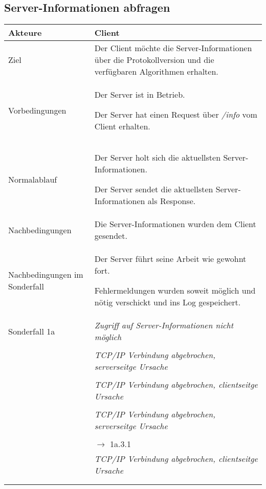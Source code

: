 \documentclass[a4paper,10pt,titlepage]{article}
\makeatletter
\newcommand\novspace{\@minipagetrue}
\newenvironment{owncompactitem}{%
\compactitem
}{%
\@finalstrut\@arstrutbox
\@nameuse{endcompactitem}%
\aftergroup\let\aftergroup\@finalstrut\aftergroup\@gobble
}
\newenvironment{owncompactenum}{%
\compactenum
}{%
\@finalstrut\@arstrutbox
\@nameuse{endcompactenum}%
\aftergroup\let\aftergroup\@finalstrut\aftergroup\@gobble
}
\newcommand{\usecase}[7]
{\subsection{#1}
\setlength{\extrarowheight}{2pt}
\begin{tabular}{|p{0.2\textwidth}|p{0.9\textwidth}|}
\hline
  Akteure & #2\\\hline
  Ziel & #3\\\hline
  Vorbedingungen & \novspace
  	\begin{owncompactitem}[-] #4 \end{owncompactitem} \\\hline
  Normalablauf & \vspace{-7pt}
  	\begin{owncompactenum}[1.] #6 \end{owncompactenum} \\\hline
  Nachbedingungen & \novspace
  	\begin{owncompactitem}[-] #5 \end{owncompactitem} \\\hline
  #7
\end{tabular}
}
\newcommand{\sonderfall}[4][\empty]
{
Sonderfall #2 & \vspace{-10pt}
	\textit{#3}
	\begin{owncompactenum}[{#2}.1] {#4} \end{owncompactenum}
  	\ifthenelse{\equal{#1}{\empty}}
    	{\\\hline} %
    	{\ensuremath{\rightarrow} #1 \\ [+1pt] \hline} %

}
\newcommand{\kurzersonderfall}[3][\empty]
{
Sonderfall #2 & \vspace{-10pt}
	\textit{#3}
  	\ifthenelse{\equal{#1}{\empty}}
    	{\\\hline} %
    	{\\&\ensuremath{\rightarrow} #1 \\ [+1pt] \hline} %

}
\newcommand{\sondernachbedingung}[1]
{
Nachbedingungen im Sonderfall& \novspace
	\begin{owncompactitem}[-]
		#1
	\end{owncompactitem} \\\hline
}
\makeatother
\begin{document}
\usecase{Server-Informationen abfragen}{Client}%
{%
Der Client möchte die Server-Informationen über die Protokollversion und die verfügbaren Algorithmen erhalten.
}{%
\item Der Server ist in Betrieb.
\item Der Server hat einen Request über \textit{/info} vom Client erhalten.
}{%
\item Die Server-Informationen wurden dem Client gesendet.
}{%
\item Der Server holt sich die aktuellsten Server-Informationen.
\item Der Server sendet die aktuellsten Server-Informationen als Response.
}{%
\sondernachbedingung{
	\item Der Server führt seine Arbeit wie gewohnt fort.
	\item Fehlermeldungen wurden soweit möglich und nötig verschickt und ins Log gespeichert.}

\sonderfall{1a}%
	{%
	Zugriff auf Server-Informationen nicht möglich
	}{%
	\item Fehlermeldung "`Zugriff auf Server-Informationen nicht möglich"' ins Log schreiben
  	\item Fehlermeldung "`Zugriff auf Server-Informationen nicht möglich"' an Admins verschicken
  	\item Fehlermeldung an Client schicken}

\sonderfall{1a.3a}%
	{%
	TCP/IP Verbindung abgebrochen, serverseitge Ursache
	}{%
	\item Fehlermeldung "`Serverseitiger Internetausfall"' ins Log schreiben
  	\item Fehlermeldung "`Serverseitiger Internetausfall"' an Admins verschicken}

\sonderfall{1a.3b}%
	{%
	TCP/IP Verbindung abgebrochen, clientseitge Ursache
	}{%
	\item Der Fehler "Clientseitiger Verbindungsabbruch" wird ins Log geschrieben.}
  	
\kurzersonderfall[1a.3.1]{2a}%
	{%
	TCP/IP Verbindung abgebrochen, serverseitge Ursache}
	
\sonderfall{2b}%
	{%
	TCP/IP Verbindung abgebrochen, clientseitge Ursache
	}{%
	\item Der Fehler "Clientseitiger Verbindungsabbruch" wird ins Log geschrieben.}
}
\end{document}
